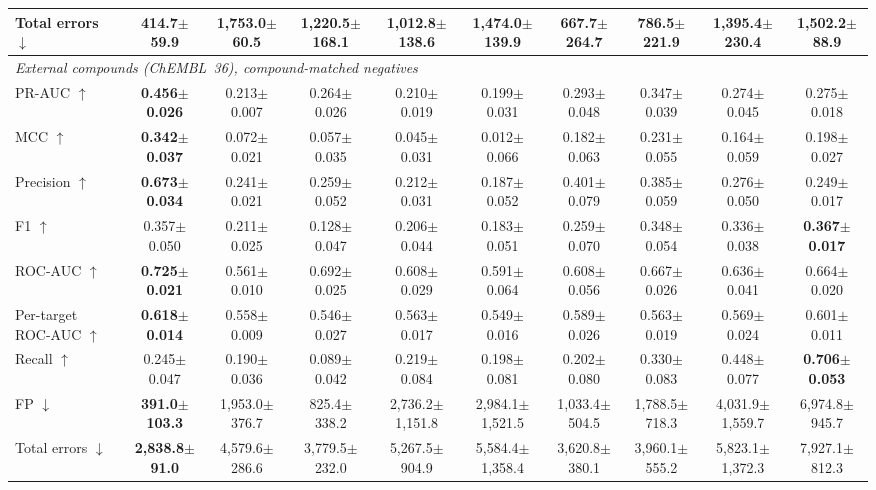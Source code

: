 \documentclass[10pt,letterpaper]{article}
\begin{document}
\begin{table}[t!]
{\begin{tabular}{l c c c c c c c c c}
Total errors $\downarrow$ & \textbf{414.7$\pm$59.9} & 1,753.0$\pm$60.5 & 1,220.5$\pm$168.1 & 1,012.8$\pm$138.6 & 1,474.0$\pm$139.9 & 667.7$\pm$264.7 & 786.5$\pm$221.9 & 1,395.4$\pm$230.4 & 1,502.2$\pm$88.9 \\
\midrule
\multicolumn{10}{l}{\textit{External compounds (ChEMBL~36), compound-matched negatives}} \\
PR-AUC $\uparrow$ & \textbf{0.456$\pm$0.026} & 0.213$\pm$0.007 & 0.264$\pm$0.026 & 0.210$\pm$0.019 & 0.199$\pm$0.031 & 0.293$\pm$0.048 & 0.347$\pm$0.039 & 0.274$\pm$0.045 & 0.275$\pm$0.018 \\
MCC $\uparrow$ & \textbf{0.342$\pm$0.037} & 0.072$\pm$0.021 & 0.057$\pm$0.035 & 0.045$\pm$0.031 & 0.012$\pm$0.066 & 0.182$\pm$0.063 & 0.231$\pm$0.055 & 0.164$\pm$0.059 & 0.198$\pm$0.027 \\
Precision $\uparrow$ & \textbf{0.673$\pm$0.034} & 0.241$\pm$0.021 & 0.259$\pm$0.052 & 0.212$\pm$0.031 & 0.187$\pm$0.052 & 0.401$\pm$0.079 & 0.385$\pm$0.059 & 0.276$\pm$0.050 & 0.249$\pm$0.017 \\
F1 $\uparrow$ & 0.357$\pm$0.050 & 0.211$\pm$0.025 & 0.128$\pm$0.047 & 0.206$\pm$0.044 & 0.183$\pm$0.051 & 0.259$\pm$0.070 & 0.348$\pm$0.054 & 0.336$\pm$0.038 & \textbf{0.367$\pm$0.017} \\
ROC-AUC $\uparrow$ & \textbf{0.725$\pm$0.021} & 0.561$\pm$0.010 & 0.692$\pm$0.025 & 0.608$\pm$0.029 & 0.591$\pm$0.064 & 0.608$\pm$0.056 & 0.667$\pm$0.026 & 0.636$\pm$0.041 & 0.664$\pm$0.020 \\
Per-target ROC-AUC $\uparrow$ & \textbf{0.618$\pm$0.014} & 0.558$\pm$0.009 & 0.546$\pm$0.027 & 0.563$\pm$0.017 & 0.549$\pm$0.016 & 0.589$\pm$0.026 & 0.563$\pm$0.019 & 0.569$\pm$0.024 & 0.601$\pm$0.011 \\
Recall $\uparrow$ & 0.245$\pm$0.047 & 0.190$\pm$0.036 & 0.089$\pm$0.042 & 0.219$\pm$0.084 & 0.198$\pm$0.081 & 0.202$\pm$0.080 & 0.330$\pm$0.083 & 0.448$\pm$0.077 & \textbf{0.706$\pm$0.053} \\
FP $\downarrow$ & \textbf{391.0$\pm$103.3} & 1,953.0$\pm$376.7 & 825.4$\pm$338.2 & 2,736.2$\pm$1,151.8 & 2,984.1$\pm$1,521.5 & 1,033.4$\pm$504.5 & 1,788.5$\pm$718.3 & 4,031.9$\pm$1,559.7 & 6,974.8$\pm$945.7 \\
Total errors $\downarrow$ & \textbf{2,838.8$\pm$91.0} & 4,579.6$\pm$286.6 & 3,779.5$\pm$232.0 & 5,267.5$\pm$904.9 & 5,584.4$\pm$1,358.4 & 3,620.8$\pm$380.1 & 3,960.1$\pm$555.2 & 5,823.1$\pm$1,372.3 & 7,927.1$\pm$812.3 \\
\bottomrule
\end{tabular}}
\end{table}
\end{document}
